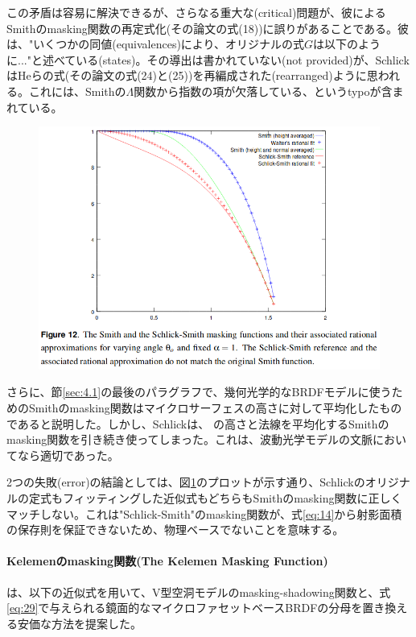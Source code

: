 \documentclass[a4j,xelatex,ja=standard]{bxjsarticle}
\begin{document}
この矛盾は容易に解決できるが、さらなる重大な(critical)問題が、彼によるSmithのmasking関数の再定式化(その論文の式(18))に誤りがあることである。彼は、"いくつかの同値(equivalences)により、オリジナルの式$G$は以下のように..."と述べている(states)。その導出は書かれていない(not provided)が、SchlickはHeらの式(その論文の式(24)と(25))を再編成された(rearranged)ように思われる。これには、Smithの$\Lambda$関数から指数の項が欠落している、というtypoが含まれている。

\begin{figure}
    \includegraphics[width=\textwidth]{Figure12.png}
    \caption{}
    \label{fig:12}
\end{figure}

さらに、節\ref{sec:4.1}の最後のパラグラフで、幾何光学的なBRDFモデルに使うためのSmithのmasking関数はマイクロサーフェスの高さに対して平均化したものであると説明した。しかし、Schlickは、\citeauthor{He1991} \cite{He1991}の高さと法線を平均化するSmithのmasking関数を引き続き使ってしまった。これは、波動光学モデルの文脈においてなら適切であった。

2つの失敗(error)の結論としては、図\ref{fig:12}のプロットが示す通り、Schlickのオリジナルの定式もフィッティングした近似式もどちらもSmithのmasking関数に正しくマッチしない。これは"Schlick-Smith"のmasking関数が、式\ref{eq:14}から射影面積の保存則を保証できないため、物理ベースでないことを意味する。

\paragraph{Kelemenのmasking関数(The Kelemen Masking Function)}

\citeauthor{Kelemen2001} \cite{Kelemen2001}は、以下の近似式を用いて、V型空洞モデルのmasking-shadowing関数と、式\eqref{eq:29}で与えられる鏡面的なマイクロファセットベースBRDFの分母を置き換える安価な方法を提案した。
\end{document}

